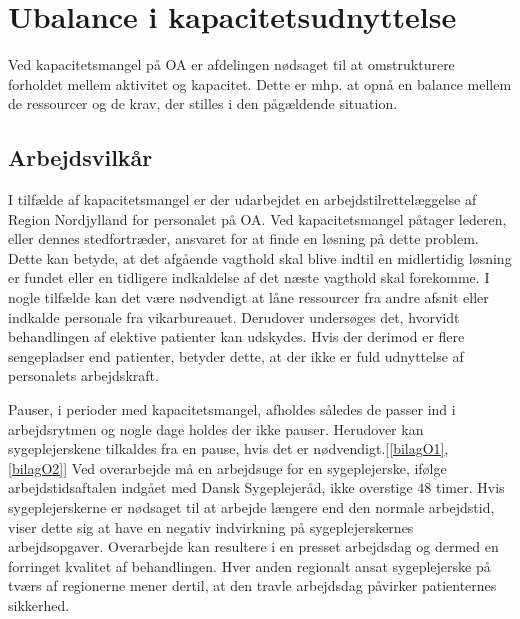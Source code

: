 \section{Ubalance i kapacitetsudnyttelse}
Ved kapacitetsmangel på OA er afdelingen nødsaget til at omstrukturere forholdet mellem aktivitet og kapacitet. Dette er mhp. at opnå en balance mellem de ressourcer og de krav, der stilles i den pågældende situation.\cite{Bjerg2016} %

\subsection{Arbejdsvilkår} \label{Per_sik}

I tilfælde af kapacitetsmangel er der udarbejdet en arbejdstilrettelæggelse af Region Nordjylland for personalet på OA. Ved kapacitetsmangel påtager lederen, eller dennes stedfortræder, ansvaret for at finde en løsning på dette problem. Dette kan betyde, at det afgående vagthold skal blive indtil en midlertidig løsning er fundet eller en tidligere indkaldelse af det næste vagthold skal forekomme. I nogle tilfælde kan det være nødvendigt at låne ressourcer fra andre afsnit eller indkalde personale fra vikarbureauet. Derudover undersøges det, hvorvidt behandlingen af elektive patienter kan udskydes.\cite{Bjerg2016} 
Hvis der derimod er flere sengepladser end patienter, betyder dette, at der ikke er fuld udnyttelse af personalets arbejdskraft.

Pauser, i perioder med kapacitetsmangel, afholdes således de passer ind i arbejdsrytmen og nogle dage holdes der ikke pauser. Herudover kan sygeplejerskene tilkaldes fra en pause, hvis det er nødvendigt.[\ref{bilagO1}, \ref{bilagO2}] Ved overarbejde må en arbejdsuge for en sygeplejerske, ifølge arbejdstidsaftalen indgået med Dansk Sygeplejeråd, ikke overstige $48$ timer. Hvis sygeplejerskerne er nødsaget til at arbejde længere end den normale arbejdstid, viser dette sig at have en negativ indvirkning på sygeplejerskernes arbejdsopgaver\cite{Dinges2004}. Overarbejde kan resultere i en presset arbejdsdag og dermed en forringet kvalitet af behandlingen. Hver anden regionalt ansat sygeplejerske på tværs af regionerne mener dertil, at den travle arbejdsdag påvirker patienternes sikkerhed.\cite{Kjeldsen2015}


